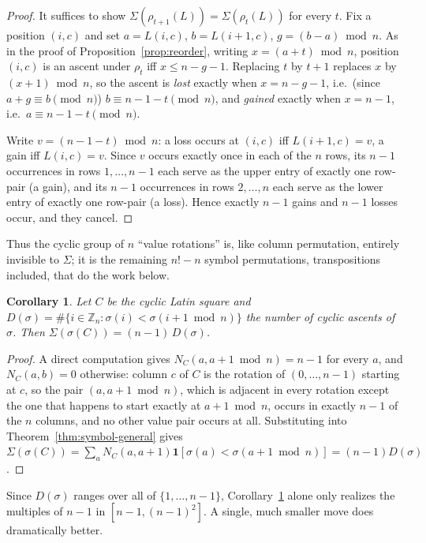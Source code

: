 \documentclass[11pt]{amsart}
\newtheorem{corollary}[theorem]{Corollary}
\begin{document}
\begin{proof}
It suffices to show $\Sigma(\rho_{t+1}(L))=\Sigma(\rho_t(L))$ for every $t$. Fix a position $(i,c)$ and set $a=L(i,c)$, $b=L(i+1,c)$, $g=(b-a)\bmod n$. As in the proof of Proposition~\ref{prop:reorder}, writing $x=(a+t)\bmod n$, position $(i,c)$ is an ascent under $\rho_t$ iff $x\le n-g-1$. Replacing $t$ by $t+1$ replaces $x$ by $(x+1)\bmod n$, so the ascent is \emph{lost} exactly when $x=n-g-1$, i.e.\ (since $a+g\equiv b\pmod n$) $b\equiv n-1-t\pmod n$, and \emph{gained} exactly when $x=n-1$, i.e.\ $a\equiv n-1-t\pmod n$.

Write $v=(n-1-t)\bmod n$: a loss occurs at $(i,c)$ iff $L(i+1,c)=v$, a gain iff $L(i,c)=v$. Since $v$ occurs exactly once in each of the $n$ rows, its $n-1$ occurrences in rows $1,\dots,n-1$ each serve as the upper entry of exactly one row-pair (a gain), and its $n-1$ occurrences in rows $2,\dots,n$ each serve as the lower entry of exactly one row-pair (a loss). Hence exactly $n-1$ gains and $n-1$ losses occur, and they cancel.
\end{proof}

Thus the cyclic group of $n$ ``value rotations'' is, like column permutation, entirely invisible to $\Sigma$; it is the remaining $n!-n$ symbol permutations, transpositions included, that do the work below.

\begin{corollary}\label{prop:symbol}
Let $C$ be the cyclic Latin square and $D(\sigma)=\#\{i\in\mathbb Z_n : \sigma(i)<\sigma(i+1\bmod n)\}$ the number of \emph{cyclic ascents} of $\sigma$. Then $\Sigma(\sigma(C)) = (n-1)\,D(\sigma)$.
\end{corollary}

\begin{proof}
A direct computation gives $N_C(a,a{+}1\bmod n)=n-1$ for every $a$, and $N_C(a,b)=0$ otherwise: column $c$ of $C$ is the rotation of $(0,\dots,n-1)$ starting at $c$, so the pair $(a,a{+}1\bmod n)$, which is adjacent in every rotation except the one that happens to start exactly at $a{+}1\bmod n$, occurs in exactly $n-1$ of the $n$ columns, and no other value pair occurs at all. Substituting into Theorem~\ref{thm:symbol-general} gives $\Sigma(\sigma(C))=\sum_a N_C(a,a{+}1)\mathbf{1}[\sigma(a)<\sigma(a{+}1\bmod n)] = (n-1)D(\sigma)$.
\end{proof}

Since $D(\sigma)$ ranges over all of $\{1,\dots,n-1\}$, Corollary~\ref{prop:symbol} alone only realizes the multiples of $n-1$ in $[n-1,(n-1)^2]$. A single, much smaller move does dramatically better.
\end{document}
